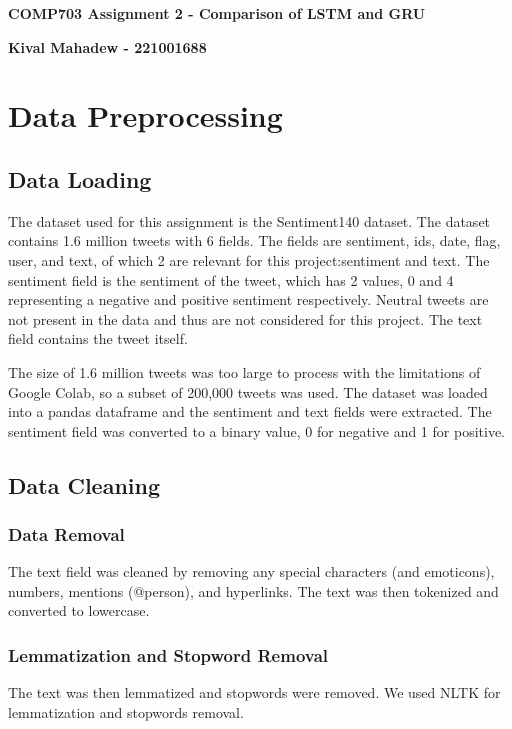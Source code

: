\documentclass{article}
\begin{document}
\begin{titlepage}
    \begin{center}
        \vspace*{1cm}

        \textbf{ COMP703 Assignment 2 - Comparison of LSTM and GRU}
        \vspace{0.5cm}

        \textbf{Kival Mahadew - 221001688}
        \vfill
        \vspace{0.8cm}
    \end{center}
\end{titlepage}

\section{Data Preprocessing}
\subsection{Data Loading}
The dataset used for this assignment is the Sentiment140 dataset. The dataset contains 1.6 million tweets with 6 fields. The fields are sentiment, ids, date, flag, user, and text, of which 2 are relevant for this project:sentiment and text. The sentiment field is the sentiment of the tweet, which has 2 values, 0 and 4 representing a negative and positive sentiment respectively. Neutral tweets are not present in the data and thus are not considered for this project. The text field contains the tweet itself.

The size of 1.6 million tweets was too large to process with the limitations of Google Colab, so a subset of 200,000 tweets was used. The dataset was loaded into a pandas dataframe and the sentiment and text fields were extracted. The sentiment field was converted to a binary value, 0 for negative and 1 for positive.

\subsection{Data Cleaning}
\subsubsection{Data Removal}
The text field was cleaned by removing any special characters (and emoticons), numbers, mentions (@person), and hyperlinks. The text was then tokenized and converted to lowercase.

\subsubsection{Lemmatization and Stopword Removal}
The text was then lemmatized and stopwords were removed. We used NLTK for lemmatization and stopwords removal.
\end{document}

